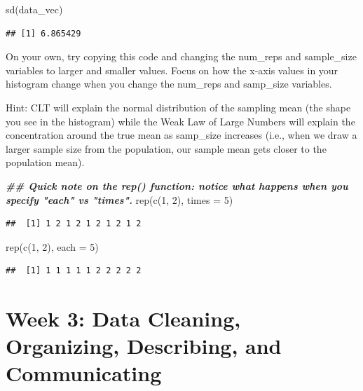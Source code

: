 \documentclass[
]{book}
\newenvironment{Shaded}{\begin{snugshade}}{\end{snugshade}}
\newcommand{\AttributeTok}[1]{\textcolor[rgb]{0.77,0.63,0.00}{#1}}
\newcommand{\DecValTok}[1]{\textcolor[rgb]{0.00,0.00,0.81}{#1}}
\newcommand{\DocumentationTok}[1]{\textcolor[rgb]{0.56,0.35,0.01}{\textbf{\textit{#1}}}}
\newcommand{\FunctionTok}[1]{\textcolor[rgb]{0.00,0.00,0.00}{#1}}
\newcommand{\NormalTok}[1]{#1}
\begin{document}
\begin{Shaded}
\begin{Highlighting}[]
\FunctionTok{sd}\NormalTok{(data\_vec)}
\end{Highlighting}
\end{Shaded}

\begin{verbatim}
## [1] 6.865429
\end{verbatim}

On your own, try copying this code and changing the num\_reps and sample\_size variables to larger and smaller values. Focus on how the x-axis values in your histogram change when you change the num\_reps and samp\_size variables.

Hint: CLT will explain the normal distribution of the sampling mean (the shape you see in the histogram) while the Weak Law of Large Numbers will explain the concentration around the true mean as samp\_size increases (i.e., when we draw a larger sample size from the population, our sample mean gets closer to the population mean).

\begin{Shaded}
\begin{Highlighting}[]
\DocumentationTok{\#\# Quick note on the rep() function: notice what happens when you specify "each" vs "times".}
\FunctionTok{rep}\NormalTok{(}\FunctionTok{c}\NormalTok{(}\DecValTok{1}\NormalTok{, }\DecValTok{2}\NormalTok{), }\AttributeTok{times =} \DecValTok{5}\NormalTok{)}
\end{Highlighting}
\end{Shaded}

\begin{verbatim}
##  [1] 1 2 1 2 1 2 1 2 1 2
\end{verbatim}

\begin{Shaded}
\begin{Highlighting}[]
\FunctionTok{rep}\NormalTok{(}\FunctionTok{c}\NormalTok{(}\DecValTok{1}\NormalTok{, }\DecValTok{2}\NormalTok{), }\AttributeTok{each =} \DecValTok{5}\NormalTok{)}
\end{Highlighting}
\end{Shaded}

\begin{verbatim}
##  [1] 1 1 1 1 1 2 2 2 2 2
\end{verbatim}

\hypertarget{week-3-data-cleaning-organizing-describing-and-communicating}{%
\chapter{Week 3: Data Cleaning, Organizing, Describing, and Communicating}\label{week-3-data-cleaning-organizing-describing-and-communicating}}
\end{document}
